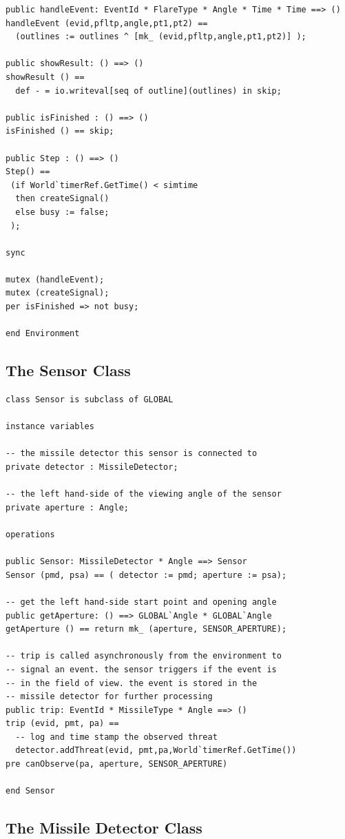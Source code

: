 \documentclass{overturerepchap}
\begin{document}
\begin{lstlisting}
public handleEvent: EventId * FlareType * Angle * Time * Time ==> ()
handleEvent (evid,pfltp,angle,pt1,pt2) ==
  (outlines := outlines ^ [mk_ (evid,pfltp,angle,pt1,pt2)] );

public showResult: () ==> ()
showResult () ==
  def - = io.writeval[seq of outline](outlines) in skip;

public isFinished : () ==> ()
isFinished () == skip;

public Step : () ==> ()
Step() ==
 (if World`timerRef.GetTime() < simtime
  then createSignal()
  else busy := false;
 );
 
sync

mutex (handleEvent);
mutex (createSignal);
per isFinished => not busy;

end Environment
\end{lstlisting}

\subsection{The Sensor Class}

\begin{lstlisting}
class Sensor is subclass of GLOBAL

instance variables

-- the missile detector this sensor is connected to
private detector : MissileDetector;

-- the left hand-side of the viewing angle of the sensor
private aperture : Angle;

operations

public Sensor: MissileDetector * Angle ==> Sensor
Sensor (pmd, psa) == ( detector := pmd; aperture := psa);

-- get the left hand-side start point and opening angle
public getAperture: () ==> GLOBAL`Angle * GLOBAL`Angle
getAperture () == return mk_ (aperture, SENSOR_APERTURE);

-- trip is called asynchronously from the environment to
-- signal an event. the sensor triggers if the event is
-- in the field of view. the event is stored in the
-- missile detector for further processing
public trip: EventId * MissileType * Angle ==> ()
trip (evid, pmt, pa) ==
  -- log and time stamp the observed threat
  detector.addThreat(evid, pmt,pa,World`timerRef.GetTime())
pre canObserve(pa, aperture, SENSOR_APERTURE)

end Sensor
\end{lstlisting}

\subsection{The Missile Detector Class}
\end{document}
